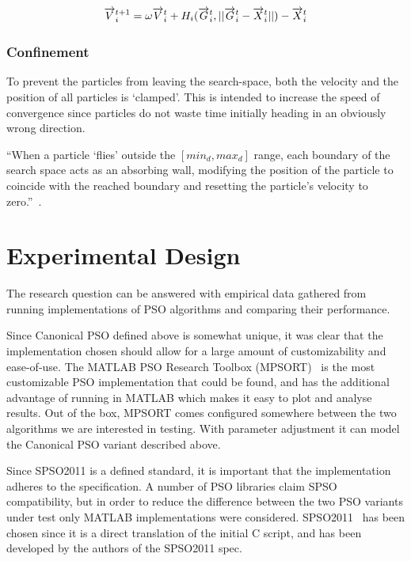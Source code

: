 \documentclass{csfourzero}
\newcommand{\rarrow}[1]{\overrightarrow{#1\vphantom{b}}}
\begin{document}
\begin{equation}
  \rarrow{V}_i^{t+1} = \omega \rarrow{V}_i^t + H_i(\rarrow{G}_i^t,||\rarrow{G}_i^t - \rarrow{X}_i^t||) - \rarrow{X}_i^t
\end{equation}

\subsubsection{Confinement} %

To prevent the particles from leaving the search-space, both the velocity and
the position of all particles is `clamped'. This is intended to increase the
speed of convergence since particles do not waste time initially heading in an
obviously wrong direction.

``When a particle `flies' outside the $[min_d ,max_d]$ range, each boundary of
the search space acts as an absorbing wall, modifying the position of the
particle to coincide with the reached boundary and resetting the particle's
velocity to zero.''~\cite{ZambranoBigiarini:2013dl}.

\section{Experimental Design}

The research question can be answered with empirical data gathered from running
implementations of PSO algorithms and comparing their performance.

Since Canonical PSO defined above is somewhat unique, it was clear that the
implementation chosen should allow for a large amount of customizability and
ease-of-use.  The MATLAB PSO Research Toolbox
(MPSORT)~\cite{MATLABPSOResearch:2011ux} is the most customizable PSO
implementation that could be found, and has the additional advantage of running
in MATLAB which makes it easy to plot and analyse results. Out of the box,
MPSORT comes configured somewhere between the two algorithms we are interested
in testing. With parameter adjustment it can model the Canonical PSO variant
described above.

Since SPSO2011 is a defined standard, it is important that the implementation
adheres to the specification. A number of PSO libraries claim SPSO
compatibility, but in order to reduce the difference between the two PSO
variants under test only MATLAB implementations were considered.
SPSO2011~\cite{SPSOMATLAB:zOjlExcK} has been chosen since it is a direct
translation of the initial C script, and has been developed by the authors of
the SPSO2011 spec.
\end{document}
